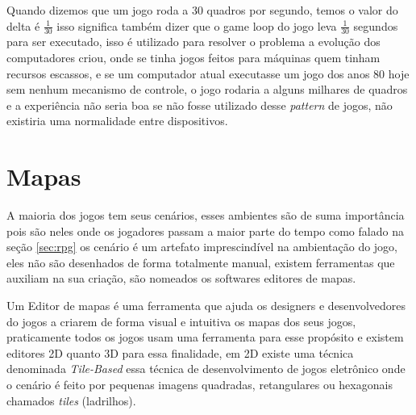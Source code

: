  Quando dizemos que um jogo roda a 30 quadros por segundo, temos o valor do delta é \(\frac{1}{30}\) isso significa também dizer que o game loop do jogo leva \(\frac{1}{30}\) segundos para ser executado, isso é utilizado para resolver o problema a evolução dos computadores criou, onde se tinha jogos feitos para máquinas quem tinham recursos escassos, e se um computador atual executasse um jogo dos anos 80 hoje sem nenhum mecanismo de controle, o jogo rodaria a alguns milhares de quadros e a experiência não seria boa se não fosse utilizado desse \textit{pattern} de jogos, não existiria uma normalidade entre dispositivos.



\section{Mapas}
\label{sec-mapas}

A maioria dos jogos tem seus cenários, esses ambientes são de suma importância pois são neles onde os jogadores passam a maior parte do tempo como falado na seção \ref{sec:rpg} os cenário é um artefato imprescindível na ambientação do jogo, eles não são desenhados de forma totalmente manual, existem ferramentas que auxiliam na sua criação, são nomeados os softwares editores de mapas.

Um Editor de mapas é uma ferramenta que ajuda os designers e desenvolvedores do jogos a criarem de forma visual e intuitiva os mapas dos seus jogos, praticamente todos os jogos usam uma ferramenta para esse propósito e existem editores 2D quanto 3D para essa finalidade, em 2D existe uma técnica denominada \textit{Tile-Based} essa técnica de desenvolvimento de jogos eletrônico onde o cenário é feito por pequenas imagens quadradas, retangulares ou hexagonais chamados \textit{tiles} (ladrilhos).

